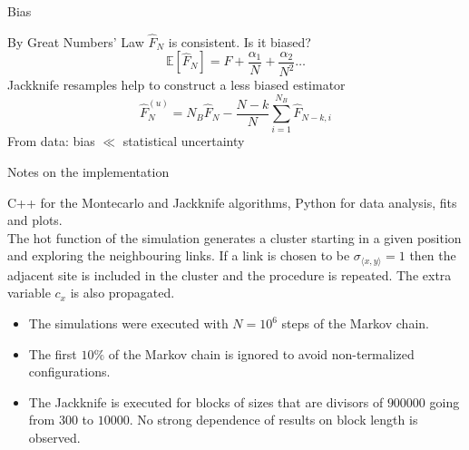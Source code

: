 \documentclass[12pt,handout]{beamer}
\begin{document}
\begin{frame}{Bias}
\begin{center}
By Great Numbers' Law $\hat{F}_N$ is consistent. Is it biased?
\[
	\mathbb E \left[\hat{F}_N\right] = F + \frac{\alpha_1}{N} + \frac{\alpha _2}{N^2} \ldots 
\]
Jackknife resamples help to construct a less biased estimator
\[
	\hat{F}^{\left(u\right)} _N = N_B\hat{F}_N - \frac{N-k}{N} \sum_{i = 1} ^ {N_B} \hat{F}_{N-k, i}
\]
From data: bias $\ll$ statistical uncertainty

\end{center}
\end{frame}


\begin{frame}{Notes on the implementation}
\begin{center}

C++ for the Montecarlo and Jackknife algorithms, Python for data analysis, fits and plots.\\
\vspace{20pt}
The hot function of the simulation generates a cluster starting in a given position and exploring the neighbouring links. If a link is chosen to be $\sigma_{\langle x, y \rangle} = 1$ then the adjacent site is included in the cluster and the procedure is repeated. The extra variable $c_x$ is also propagated.
\end{center}
\end{frame}

\begin{frame}
\begin{center}
\begin{itemize}
\item The simulations were executed with $N = 10^6$ steps of the Markov chain.\\
\vspace{10pt}
\item The first $10\%$ of the Markov chain is ignored to avoid non-termalized configurations.\\
\vspace{10pt}
\item The Jackknife is executed for blocks of sizes that are divisors of $900000$ going from $300$ to $10000$. No strong dependence of results on block length is observed.\\
\end{itemize}
\end{center}
\end{frame}
\end{document}
